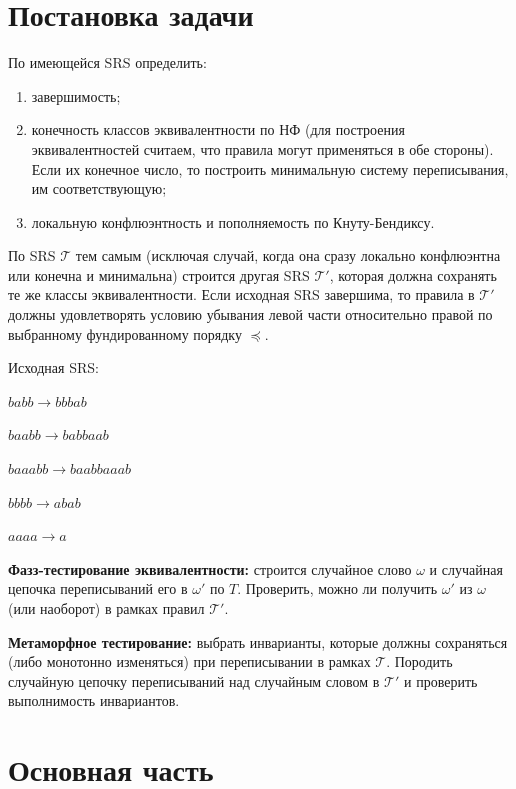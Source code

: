 \documentclass[a4paper, 14pt]{extarticle}
\newcommand{\T}{\mathcal{T}}
\begin{document}
\renewcommand{\ttdefault}{pcr}

\setlength{\tabcolsep}{3pt}
\newpage
\setcounter{page}{2}

\tableofcontents
\newpage

\section{Постановка задачи}\label{Sect::task}
По имеющейся SRS определить:

\begin{enumerate}[topsep=0pt,parsep=-5pt]
    \item завершимость;
    \item конечность классов эквивалентности по НФ (для построения эквивалентностей считаем, что правила могут применяться в обе стороны). Если их конечное число, то построить минимальную систему переписывания, им соответствующую;
    \item локальную конфлюэнтность и пополняемость по Кнуту-Бендиксу.
\end{enumerate}

По SRS $\T$ тем самым (исключая случай, когда она сразу локально конфлюэнтна
или конечна и минимальна) строится другая SRS $\T'$, которая должна сохранять
те же классы эквивалентности. Если исходная SRS завершима, то правила в $\T'$
должны удовлетворять условию убывания левой части относительно правой по выбранному фундированному порядку $\preceq$.

Исходная SRS:

$babb \to bbbab$

$baabb \to babbaab$ 

$baaabb \to baabbaaab$ 

$bbbb \to abab$ 

$aaaa \to a$

\textbf{Фазз-тестирование эквивалентности:} строится случайное слово $\omega$ и случайная цепочка переписываний его в $\omega'$ по $T$. Проверить, можно ли получить $\omega'$ из
$\omega$ (или наоборот) в рамках правил $\T'$.

\textbf{Метаморфное тестирование:} выбрать инварианты, которые должны сохраняться (либо монотонно изменяться) при переписывании в рамках $\T$. Породить случайную цепочку переписываний над случайным словом в $\T'$ и проверить выполнимость инвариантов. 

\section{Основная часть}\label{Sect::realisation}
\end{document}
